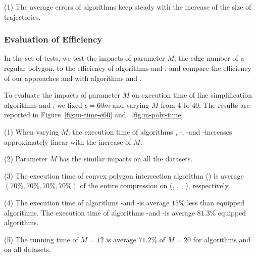 \ni(1) The average errors of \lsa algorithms keep steady with the increase of the size of trajectories.





\subsubsection{Evaluation of Efficiency}


In the set of tests, we test the impacts of parameter $M$, \ie the edge number of a regular polygon, to the efficiency of algorithms \cist and \cista, and compare the efficiency of our approaches \cist and \cista with algorithms \dps and \squishe.
%





To evaluate the impacts of parameter $M$ on execution time of line simplification algorithms \cist and \cista, we fixed $\epsilon =60m$ and varying $M$ from $4$ to $40$.
%
The results are reported in Figure~\ref{fig:m-time-e60} and ~\ref{fig:m-poly-time}.

\ni(1) When varying $M$, the execution time of algorithms \cist, \cist-\cpia, \cista-\rpia and \cista-\cpia increases approximately linear with the increase of $M$.

\ni(2) Parameter $M$ has the similar impacts on all the datasets.

\ni(3) The execution time of convex polygon intersection algorithm (\cpia) is average \textcolor[rgb]{1.00,0.00,0.00}{$(70\%, 70\%, 70\%, 70\%)$} of the entire compression on (\truck, \sercar, \geolife, \pricar), respectively.

\ni(4) The execution time of algorithms \cist-\rpia and \cista-\rpia is average \textcolor[rgb]{1.00,0.00,0.00}{$15\%$} less than \cpia equipped algorithms.
The execution time of algorithms \cist-\rpia and \cista-\rpia is average \textcolor[rgb]{1.00,0.00,0.00}{$81.3\%$} \cpia equipped algorithms.

\ni(5) The running time of $M=12$ is average \textcolor[rgb]{1.00,0.00,0.00}{$71.2\%$} of $M=20$ for algorithms \cist and \cista on all datasets.

